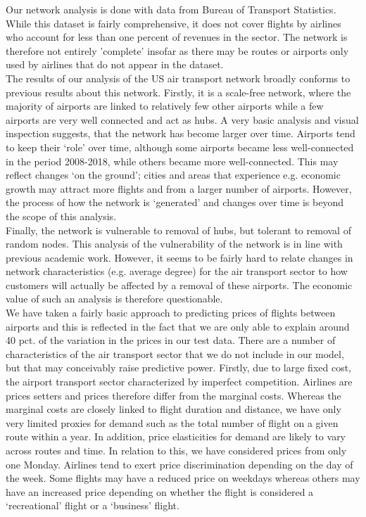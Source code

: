 \label{sec:results}
Our network analysis is done with data from Bureau of Transport Statistics. While this dataset is fairly comprehensive, it does not cover flights by airlines who account for less than one percent of revenues in the sector. The network is therefore not entirely 'complete' insofar as there may be routes or airports only used by airlines that do not appear in the dataset.\\
The results of our analysis of the US air transport network broadly conforms to previous results about this network. Firstly, it is a scale-free network, where the majority of airports are linked to relatively few other airports while a few airports are very well connected and act as hubs. A very basic analysis and visual inspection suggests, that the network has become larger over time. Airports tend to keep their `role' over time, although some airports became less well-connected in the period 2008-2018, while others became more well-connected. This may reflect changes `on the ground'; cities and areas that experience e.g. economic growth may attract more flights and from a larger number of airports. However, the process of how the network is `generated' and changes over time is beyond the scope of this analysis. \\ 
Finally, the network is vulnerable to removal of hubs, but tolerant to removal of random nodes. This analysis of the vulnerability of the network is in line with previous academic work. However, it seems to be fairly hard to relate changes in network characteristics (e.g. average degree) for the air transport sector to how customers will actually be affected by a removal of these airports. The economic value of such an analysis is therefore questionable. \\

We have taken a fairly basic approach to predicting prices of flights between airports and this is reflected in the fact that we are only able to explain around 40 pct. of the variation in the prices in our test data. There are a number of characteristics of the air transport sector that we do not include in our model, but that may conceivably raise predictive power. 
Firstly, due to large fixed cost, the airport transport sector characterized by imperfect competition. Airlines are prices setters and prices therefore differ from the marginal costs. Whereas the marginal costs are closely linked to flight duration and distance, we have only very limited proxies for demand such as the total number of flight on a given route within a year. In addition, price elasticities for demand are likely to vary across routes and time.
In relation to this, we have considered prices from only one Monday. Airlines tend to exert price discrimination depending on the day of the week. Some flights may have a reduced price on weekdays whereas others may have an increased price depending on whether the flight is considered a `recreational' flight or a `business' flight. 

